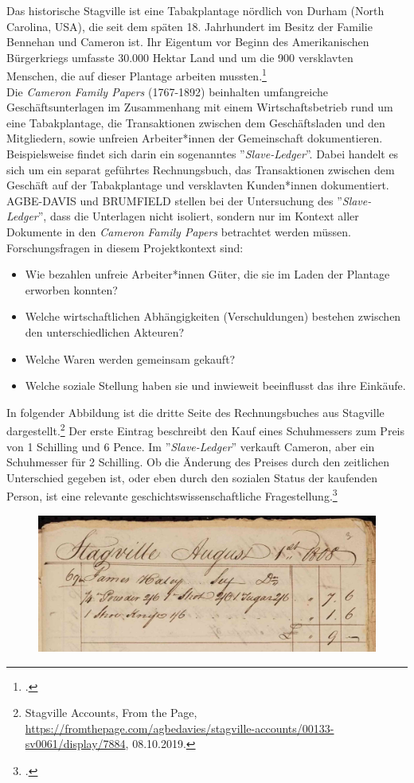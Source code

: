 \documentclass[12pt,a4paper]{article}
\begin{document}
Das historische Stagville ist eine Tabakplantage nördlich von Durham (North Carolina, USA), die seit dem späten 18. Jahrhundert im Besitz der Familie Bennehan und Cameron ist. Ihr Eigentum vor Beginn des Amerikanischen Bürgerkriegs umfasste 30.000 Hektar Land und um die 900 versklavten Menschen, die auf dieser Plantage arbeiten mussten.\footcite[][]{brumfield2015medea}
\\
Die \textit{Cameron Family Papers} (1767-1892) beinhalten umfangreiche Geschäftsunterlagen im Zusammenhang mit einem Wirtschaftsbetrieb rund um eine Tabakplantage, die Transaktionen zwischen dem Geschäftsladen und den Mitgliedern, sowie unfreien Arbeiter*innen der Gemeinschaft dokumentieren. Beispielsweise findet sich darin ein sogenanntes ''\textit{Slave-Ledger}''. Dabei handelt es sich um ein separat geführtes Rechnungsbuch, das Transaktionen zwischen dem Geschäft auf der Tabakplantage und versklavten Kunden*innen dokumentiert.
\\
AGBE-DAVIS und BRUMFIELD stellen bei der Untersuchung des ''\textit{Slave-Ledger}'', dass die Unterlagen nicht isoliert, sondern nur im Kontext aller Dokumente in den \textit{Cameron Family Papers} betrachtet werden müssen. Forschungsfragen in diesem Projektkontext sind:
\begin{itemize}
\item Wie bezahlen unfreie Arbeiter*innen Güter, die sie im Laden der Plantage erworben konnten?
\item Welche wirtschaftlichen Abhängigkeiten (Verschuldungen) bestehen zwischen den unterschiedlichen Akteuren?
\item Welche Waren werden gemeinsam gekauft?
\item Welche soziale Stellung haben sie und inwieweit beeinflusst das ihre Einkäufe.
\end{itemize}
In folgender Abbildung ist die dritte Seite des Rechnungsbuches aus Stagville dargestellt.\footnote{Stagville Accounts, From the Page, \protect\url{https://fromthepage.com/agbedavies/stagville-accounts/00133-sv0061/display/7884}, 08.10.2019.} Der erste Eintrag beschreibt den Kauf eines Schuhmessers zum Preis von 1 Schilling und 6 Pence. Im ''\textit{Slave-Ledger}'' verkauft Cameron, aber ein Schuhmesser für 2 Schilling. Ob die Änderung des Preises durch den zeitlichen Unterschied gegeben ist, oder eben durch den sozialen Status der kaufenden Person, ist eine relevante geschichtswissenschaftliche Fragestellung.\footcite[][]{brumfield2019blog}
\begin{figure}[H]
  \centering
  \includegraphics[width=1\textwidth]{img/stagville.jpg}  
  \caption[]{} \label{fig:stagville}
\end{figure}
\end{document}
